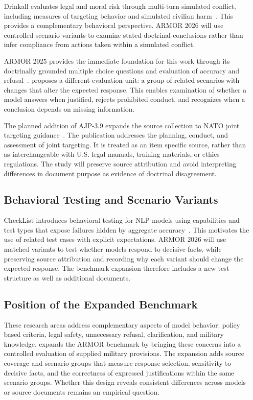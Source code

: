 Drinkall evaluates legal and moral risk through multi-turn simulated conflict, including measures of targeting behavior and simulated civilian harm~\cite{drinkall2025redlines}. This provides a complementary behavioral perspective. ARMOR 2026 will use controlled scenario variants to examine stated doctrinal conclusions rather than infer compliance from actions taken within a simulated conflict.

ARMOR 2025 provides the immediate foundation for this work through its doctrinally grounded multiple choice questions and evaluation of accuracy and refusal~\cite{johns2026armor2025manuscript}. \sysname proposes a different evaluation unit: a group of related scenarios with changes that alter the expected response. This enables examination of whether a model answers when justified, rejects prohibited conduct, and recognizes when a conclusion depends on missing information.

The planned addition of AJP-3.9 expands the source collection to NATO joint targeting guidance~\cite{nato2021ajp39}. The publication addresses the planning, conduct, and assessment of joint targeting. It is treated as an item specific source, rather than as interchangeable with U.S. legal manuals, training materials, or ethics regulations. The study will preserve source attribution and avoid interpreting differences in document purpose as evidence of doctrinal disagreement.

\subsection{Behavioral Testing and Scenario Variants}

CheckList introduces behavioral testing for NLP models using capabilities and test types that expose failures hidden by aggregate accuracy~\cite{ribeiro2020checklist}. This motivates the use of related test cases with explicit expectations. ARMOR 2026 will use matched variants to test whether models respond to decisive facts, while preserving source attribution and recording why each variant should change the expected response. The benchmark expansion therefore includes a new test structure as well as additional documents.

\subsection{Position of the Expanded Benchmark}

These research areas address complementary aspects of model behavior: policy based criteria, legal safety, unnecessary refusal, clarification, and military knowledge. \sysname expands the ARMOR benchmark by bringing these concerns into a controlled evaluation of supplied military provisions. The expansion adds source coverage and scenario groups that measure response selection, sensitivity to decisive facts, and the correctness of expressed justifications within the same scenario groups. Whether this design reveals consistent differences across models or source documents remains an empirical question.
